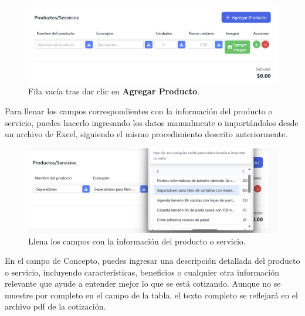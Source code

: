 \documentclass{Pretexto/bluereport}
\begin{document}
\begin{minipage}
\begin{figure}[H] 
    \centering
        \includegraphics[width=0.8\linewidth]{img/agregar_producto.png}
    \caption{Fila vacía tras dar clic en \textbf{Agregar Producto}.}
    \label{fig:llenar_producto}
\end{figure}
Para llenar los campos correspondientes con la información del producto o servicio, puedes hacerlo ingresando
los datos manualmente o importándolos desde un archivo de Excel, siguiendo el mismo procedimiento descrito anteriormente.
\begin{figure}[H] 
    \centering
        \includegraphics[width=0.8\linewidth]{img/concepto.png}
    \caption{Llena los campos con la información del producto o servicio.}
    \label{fig:llenar_producto}
\end{figure}
En el campo de Concepto, puedes ingresar una descripción detallada del producto o servicio, incluyendo características, beneficios o 
cualquier otra información relevante que ayude a entender mejor lo que se está cotizando. Aunque no se muestre por completo en el campo
de la tabla, el texto completo se reflejará en el archivo pdf de la cotización.


\end{minipage}
\end{document}
